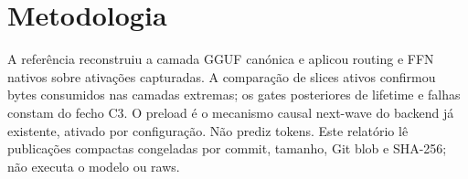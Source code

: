 \section{Metodologia}
A referência reconstruiu a camada GGUF canónica e aplicou routing e FFN nativos sobre ativações capturadas. A comparação de slices ativos confirmou bytes consumidos nas camadas extremas; os gates posteriores de lifetime e falhas constam do fecho C3. O preload é o mecanismo causal next-wave do backend já existente, ativado por configuração. Não prediz tokens. Este relatório lê publicações compactas congeladas por commit, tamanho, Git blob e SHA-256; não executa o modelo ou raws.  
